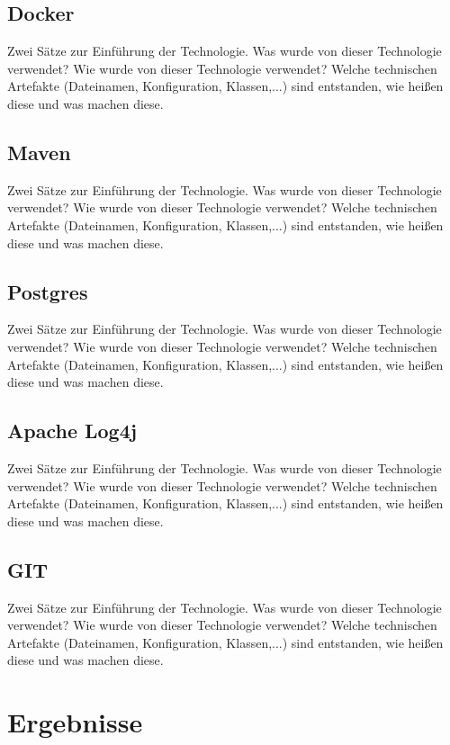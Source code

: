 \documentclass[fleqn,10pt,ngerman]{SelfArx}
\begin{document}
	
	\subsection{Docker}
	Zwei Sätze zur Einführung der Technologie. 
	Was wurde von dieser Technologie verwendet?
	Wie wurde von dieser Technologie verwendet?
	Welche technischen Artefakte (Dateinamen, Konfiguration, Klassen,...) sind entstanden, wie heißen diese und was machen diese. 
	
	\subsection{Maven}
	Zwei Sätze zur Einführung der Technologie. 
	Was wurde von dieser Technologie verwendet?
	Wie wurde von dieser Technologie verwendet?
	Welche technischen Artefakte (Dateinamen, Konfiguration, Klassen,...) sind entstanden, wie heißen diese und was machen diese. 
	
	\subsection{Postgres}
	Zwei Sätze zur Einführung der Technologie. 
	Was wurde von dieser Technologie verwendet?
	Wie wurde von dieser Technologie verwendet?
	Welche technischen Artefakte (Dateinamen, Konfiguration, Klassen,...) sind entstanden, wie heißen diese und was machen diese. 
	
	
	\subsection{Apache Log4j}
	Zwei Sätze zur Einführung der Technologie. 
	Was wurde von dieser Technologie verwendet?
	Wie wurde von dieser Technologie verwendet?
	Welche technischen Artefakte (Dateinamen, Konfiguration, Klassen,...) sind entstanden, wie heißen diese und was machen diese. 
	
	\subsection{GIT}
	Zwei Sätze zur Einführung der Technologie. 
	Was wurde von dieser Technologie verwendet?
	Wie wurde von dieser Technologie verwendet?
	Welche technischen Artefakte (Dateinamen, Konfiguration, Klassen,...) sind entstanden, wie heißen diese und was machen diese. 
	
	
	
	\section{Ergebnisse}
	
\end{document}
